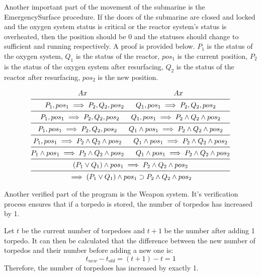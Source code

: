\documentclass{llncs}
\begin{document}
Another important part of the movement of the submarine is the EmergencySurface procedure. If the doors of the submarine are closed and locked and the oxygen system status is critical or the reactor system's status is overheated, then the position should be 0 and the statuses should change to sufficient and running respectively. A proof is provided below. $P_1$ is the status of the oxygen system, $Q_1$ is the status of the reactor, $pos_1$ is the current position, $P_2$ is the status of the oxygen system after resurfacing, $Q_2$ is the status of the reactor after resurfacing, $pos_2$ is the new position. 

\begin{gather*}
	Ax \ \ \ \ \ \ \ \ \ \ \ \ \ \ \ \ \ \ \ \ \ \ \ \ \ \ \ \ \ \ \ \ \ \ \ \ \ Ax \\ \midrule
	P_1 , pos_1 \implies P_2 , Q_2 , pos_2 \ \ \ \ \ Q_1 , pos_1 \implies P_2 , Q_2 , pos_2 \\ \midrule
	P_1 , pos_1 \implies P_2 , Q_2 , pos_2 \ \ \ \ \ Q_1 , pos_1 \implies P_2 \land Q_2 \land pos_2 \\ \midrule
	P_1 , pos_1 \implies P_2 , Q_2 , pos_2 \ \ \ \ \ Q_1 \land pos_1 \implies P_2 \land Q_2 \land pos_2 \\ \midrule
	P_1 , pos_1 \implies P_2 \land Q_2 \land pos_2 \ \ \ \ \ Q_1 \land pos_1 \implies P_2 \land Q_2 \land pos_2 \\ \midrule
	P_1 \land pos_1 \implies P_2 \land Q_2 \land pos_2 \ \ \ \ \ Q_1 \land pos_1 \implies P_2 \land Q_2 \land pos_2 \\ \midrule
	(P_1 \lor Q_1) \land pos_1 	\implies  P_2 \land Q_2 \land pos_2 \\ \midrule
	\implies (P_1 \lor Q_1) \land pos_1 \supset P_2 \land Q_2 \land pos_2 
\end{gather*}

Another verified part of the program is the Weapon system. It's verification process ensures that if a torpedo is stored, the number of torpedos has increased by 1.

Let $t$ be the current number of torpedoes and $t+1$ be the number after adding 1 torpedo. It can then be calculated that the difference between the new number of torpedos and their number before adding a new one is:
\begin{equation*}
	t_{new} - t_{old} = (t+1) - t = 1
\end{equation*}
Therefore, the number of torpedoes has increased by exactly 1.
\end{document}
